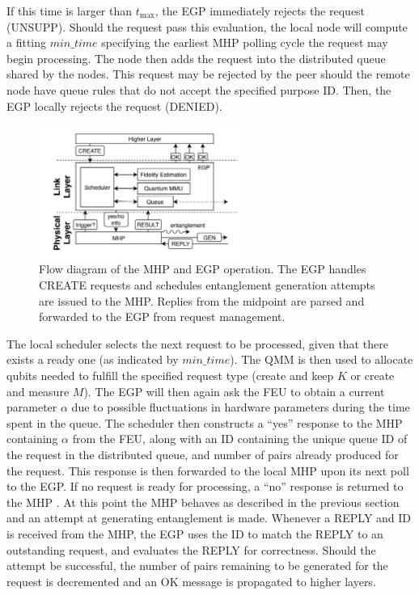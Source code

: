 \documentclass[10pt]{article}
\begin{document}
\begin{itemize}
    If this time is larger than $t_{\max}$, the EGP immediately rejects the request (UNSUPP). Should the request pass this evaluation, the local node will compute a fitting $min\_time$ specifying the earliest MHP polling cycle the request may begin processing. The node then adds the request into the distributed queue shared by the nodes. This request may be rejected by the peer should the remote node have queue rules that do not accept the specified purpose ID.
    Then, the EGP locally rejects the request (DENIED).

    \begin{figure}[htbp]
        \centering
        \includegraphics[width=0.6\textwidth]{figure/link_prorocol.jpg}
        \caption{Flow diagram of the MHP and EGP operation. The EGP handles CREATE requests and schedules entanglement generation attempts are issued to
        the MHP. Replies from the midpoint are parsed and
        forwarded to the EGP from request management.}
        \label{link protocol}
    \end{figure}

\end{itemize}

The local scheduler selects the next request to be processed, given that there exists a ready one (as indicated by $min\_time$). The QMM is then used to allocate qubits needed to fulfill the specified request type (create and keep $K$ or create and measure $M$). The EGP will then again ask the FEU to obtain a current parameter $\alpha$ due to possible fluctuations in hardware parameters during the time spent in the queue.
The scheduler then constructs a ``yes'' response to the MHP containing $\alpha$ from the FEU, along with an ID containing the unique queue ID of the request in the distributed queue, and number of pairs already produced for the request. This response is then forwarded to the local MHP upon its next poll to the EGP. If no request is ready for processing, a ``no'' response is returned to the MHP . At this point the MHP behaves as described in the previous section and an attempt at generating entanglement is made.
Whenever a REPLY and ID is received from the MHP, the EGP uses the ID to match the REPLY to an outstanding request, and evaluates the REPLY for correctness. Should the attempt be successful, the number of pairs remaining to be generated for the request is decremented and an OK message is propagated to higher layers.
\end{document}
